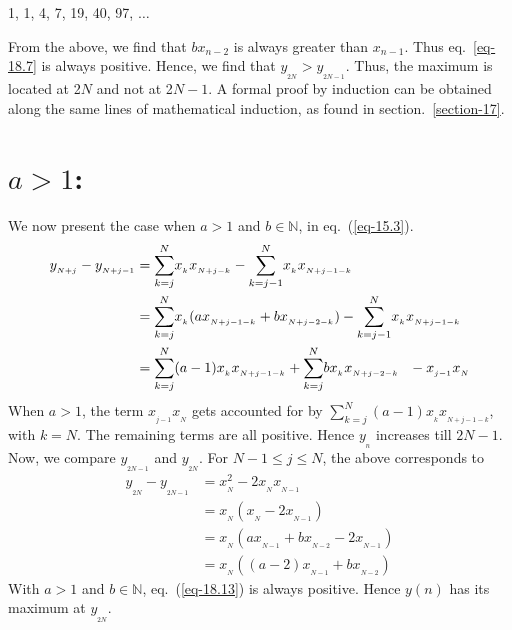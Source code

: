 \begin{multicols}{2}
\vspace{-.7cm}

\begin{center}
1, 1, 4, 7, 19, 40, 97, $\ldots$
\end{center}

\vspace{-.7cm}

From the above, we find that $bx_{{n-2}}$ is always greater than $x_{{n-1}}$. Thus eq.~\ref{eq-18.7} is always positive. Hence, we find that $y_{_{2N}} > y_{_{2N-1}}$. Thus, the maximum is located at 2$N$ and not at 2$N-1$. A formal proof by induction can be obtained along the same lines of mathematical induction, as found in section.~\ref{section-17}.

\vspace{-.5cm}

\section*{\underline{{$a>1$}}:}
We now present the case when $a > 1$ and $b \in \mathbb N$, in eq.~(\ref{eq-15.3}).
{\fontsize{8}{9}\selectfont\begin{align}
y_{_{N+j}} - y_{_{N+j-1}} &= \displaystyle{\sum_{k=j}^{N}}x_{_{k}}x_{_{N+j-k}} -  \displaystyle{\sum_{k=j-1}^{N}}x_{_k}x_{_{N+j-1-k}}\nonumber\\
&=\displaystyle{\sum_{k=j}^{N}}x_{_{k}}(a x_{_{N+j-1-k}}+b x_{_{N+j-2-k}}) -  \displaystyle{\sum_{k=j-1}^{N}}x_{_k}x_{_{N+j-1-k}}\label{eq-18.8}\\
&= \displaystyle{\sum_{k=j}^{N}}(a-1)x_{_{k}}x_{_{N+j-1-k}} + \displaystyle{\sum_{k=j}^{N}}bx_{_{k}}x_{_{N+j-2-k}} \hspace{0.1in}- x_{_{j-1}}x_{_N}\label{eq-18.9}
\end{align}}
When $a >1$, the term $x_{_{j-1}}x_{_N}$ gets accounted for by $\displaystyle{\sum_{k=j}^{N}}(a-1)x_{_{k}}x_{_{N+j-1-k}}$, with $k=N$. The remaining terms are all positive. Hence $y_{_n}$ increases till $2N-1$. Now, we compare $y_{_{2N-1}}$ and $y_{_{2N}}$.
For\hspace{0.1in} $N-1 \leq j \leq N$,\hspace{0.1in} the above corresponds to
\begin{align}
y_{_{2N}} - y_{_{2N-1}} &= x_{_N}^2 - 2x_{_N}x_{_{N-1}}\label{eq-18.10}\\
&= x_{_N}(x_{_N} - 2x_{_{N-1}})\label{eq-18.11}\\[.5cm]
&= x_{_N}(a x_{_{N-1}}+ b x_{_{N-2}}- 2x_{_{N-1}})\label{eq-18.12}\\
&= x_{_N}((a-2) x_{_{N-1}}+ b x_{_{N-2}})\label{eq-18.13}
\end{align} 
With $a > 1$ and $b \in \mathbb N$, eq.~(\ref{eq-18.13}) is always positive. Hence $y(n)$ has its maximum at $y_{_{2N}}$.


\end{multicols}
